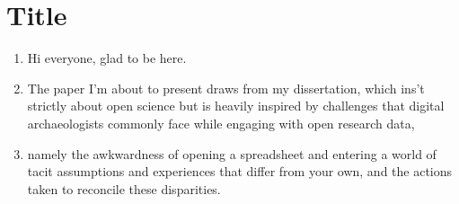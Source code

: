 \documentclass{article}
\begin{document}
\pagestyle{fancy}

\section{Title}
\begin{enumerate}
  \item Hi everyone, glad to be here.
  \item The paper I'm about to present draws from my dissertation, which ins't strictly about open science but is heavily inspired by challenges that digital archaeologists commonly face while engaging with open research data,
  \item namely the awkwardness of opening a spreadsheet and entering a world of tacit assumptions and experiences that differ from your own, and the actions taken to reconcile these disparities.
\end{enumerate}
\end{document}
